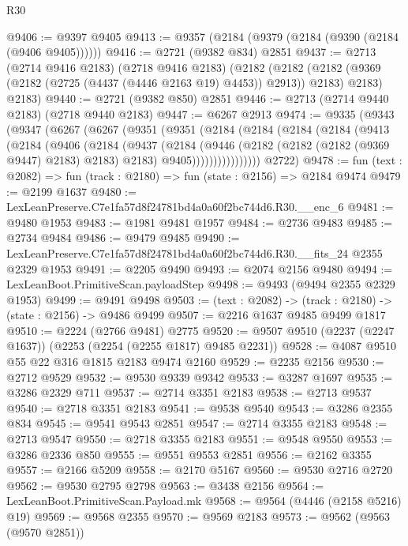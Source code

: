 \begin{lexlean}{R30}
\begin{coremodule}
@9406 := @9397 @9405
@9413 := @9357 (@2184 (@9379 (@2184 (@9390 (@2184 (@9406 @9405))))))
@9416 := @2721 (@9382 @834) @2851
@9437 := @2713
    (@2714 @9416 @2183)
    (@2718 @9416 @2183)
    (@2182
      (@2182 (@2182 (@9369 (@2182 (@2725 (@4437 (@4446 @2163 @19) @4453)) @2913)) @2183) @2183)
      @2183)
@9440 := @2721 (@9382 @850) @2851
@9446 := @2713 (@2714 @9440 @2183) (@2718 @9440 @2183)
@9447 := @6267 @2913
@9474 := @9335
    (@9343
      (@9347
        (@6267
          (@6267
            (@9351
              (@9351
                (@2184
                  (@2184
                    (@2184
                      (@2184
                        (@9413
                          (@2184
                            (@9406
                              (@2184
                                (@9437
                                  (@2184
                                    (@9446
                                      (@2182 (@2182 (@2182 (@9369 @9447) @2183) @2183) @2183)
                                      @9405))))))))))))))))
      @2722)
@9478 := fun (text : @2082) => fun (track : @2180) => fun (state : @2156) => @2184 @9474
@9479 := @2199 @1637
@9480 := LexLeanPreserve.C7e1fa57d8f24781bd4a0a60f2bc744d6.R30.__enc_6
@9481 := @9480 @1953
@9483 := @1981 @9481 @1957
@9484 := @2736 @9483
@9485 := @2734 @9484
@9486 := @9479 @9485
@9490 := LexLeanPreserve.C7e1fa57d8f24781bd4a0a60f2bc744d6.R30.__fits_24 @2355 @2329 @1953
@9491 := @2205 @9490
@9493 := @2074 @2156 @9480
@9494 := LexLeanBoot.PrimitiveScan.payloadStep
@9498 := @9493 (@9494 @2355 @2329 @1953)
@9499 := @9491 @9498
@9503 := (text : @2082) -> (track : @2180) -> (state : @2156) -> @9486 @9499
@9507 := @2216 @1637 @9485 @9499 @1817
@9510 := @2224 (@2766 @9481) @2775
@9520 := @9507 @9510 (@2237 (@2247 @1637)) (@2253 (@2254 (@2255 @1817) @9485 @2231))
@9528 := @4087 @9510 @55 @22 @316 @1815 @2183 @9474 @2160
@9529 := @2235 @2156
@9530 := @2712 @9529
@9532 := @9530 @9339 @9342
@9533 := @3287 @1697
@9535 := @3286 @2329 @711
@9537 := @2714 @3351 @2183
@9538 := @2713 @9537
@9540 := @2718 @3351 @2183
@9541 := @9538 @9540
@9543 := @3286 @2355 @834
@9545 := @9541 @9543 @2851
@9547 := @2714 @3355 @2183
@9548 := @2713 @9547
@9550 := @2718 @3355 @2183
@9551 := @9548 @9550
@9553 := @3286 @2336 @850
@9555 := @9551 @9553 @2851
@9556 := @2162 @3355
@9557 := @2166 @5209
@9558 := @2170 @5167
@9560 := @9530 @2716 @2720
@9562 := @9530 @2795 @2798
@9563 := @3438 @2156
@9564 := LexLeanBoot.PrimitiveScan.Payload.mk
@9568 := @9564 (@4446 (@2158 @5216) @19)
@9569 := @9568 @2355
@9570 := @9569 @2183
@9573 := @9562 (@9563 (@9570 @2851))

\end{coremodule}
\end{lexlean}
